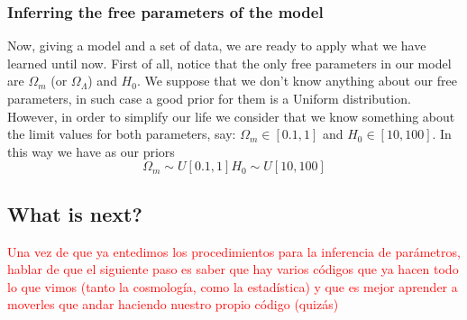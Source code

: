 \documentclass[onecolumn,           %
               showpacs,            %
               preprintnumbers,     %
               aps,                 %
               prl,          	    %
               letterpaper,             %
               superscriptaddress,      %
               nofootinbib,         %
               tightenlines,        %
               floats,floatfix      %
               ,usenatbib,
               ]{revtex4-1}
\begin{document}
\subsubsection{Inferring the free parameters of the model}

Now, giving a model and a set of data, we are ready to apply what we have learned until now. First of all, notice that the only free parameters in our model are $\Omega_m$ (or $\Omega_\Lambda$) and $H_0$. We suppose that we don't know anything about our free parameters, in such case a good prior for them is a Uniform distribution. However, in order to simplify our life we consider that we know something about the limit values for both parameters,  say: $\Omega_m\in [0.1,1]$ and $H_0\in [10,100]$. In this way we have as our priors
\begin{subequations}
\begin{equation}
\Omega_m\sim U[0.1,1]
\end{equation}
\begin{equation}
H_0\sim U[10,100]
\end{equation}
\end{subequations} 
\subsection{What is next?}

\textcolor{red}{Una vez de que ya entedimos los procedimientos para la inferencia de par\'ametros, hablar de que el siguiente paso es saber que hay varios c\'odigos que ya hacen todo lo que vimos (tanto la cosmolog\'ia, como la estad\'istica) y que es mejor aprender a moverles que andar haciendo nuestro propio código (quiz\'as)}


\end{document}
